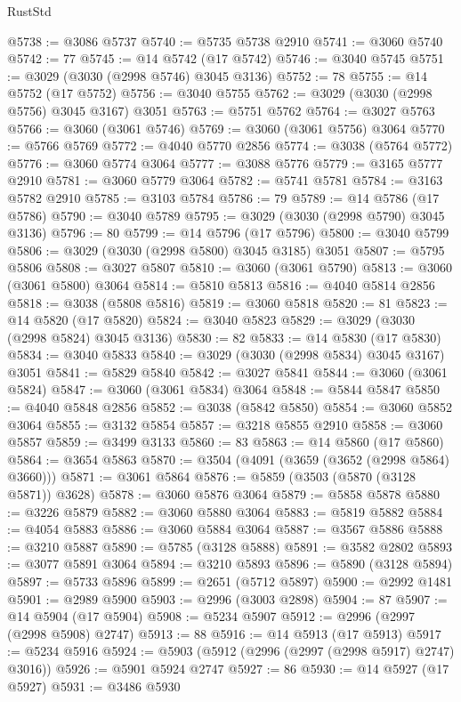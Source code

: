 \begin{lexlean}{RustStd}
\begin{coremodule}
@5738 := @3086 @5737
@5740 := @5735 @5738 @2910
@5741 := @3060 @5740
@5742 := 77
@5745 := @14 @5742 (@17 @5742)
@5746 := @3040 @5745
@5751 := @3029 (@3030 (@2998 @5746) @3045 @3136)
@5752 := 78
@5755 := @14 @5752 (@17 @5752)
@5756 := @3040 @5755
@5762 := @3029 (@3030 (@2998 @5756) @3045 @3167) @3051
@5763 := @5751 @5762
@5764 := @3027 @5763
@5766 := @3060 (@3061 @5746)
@5769 := @3060 (@3061 @5756) @3064
@5770 := @5766 @5769
@5772 := @4040 @5770 @2856
@5774 := @3038 (@5764 @5772)
@5776 := @3060 @5774 @3064
@5777 := @3088 @5776
@5779 := @3165 @5777 @2910
@5781 := @3060 @5779 @3064
@5782 := @5741 @5781
@5784 := @3163 @5782 @2910
@5785 := @3103 @5784
@5786 := 79
@5789 := @14 @5786 (@17 @5786)
@5790 := @3040 @5789
@5795 := @3029 (@3030 (@2998 @5790) @3045 @3136)
@5796 := 80
@5799 := @14 @5796 (@17 @5796)
@5800 := @3040 @5799
@5806 := @3029 (@3030 (@2998 @5800) @3045 @3185) @3051
@5807 := @5795 @5806
@5808 := @3027 @5807
@5810 := @3060 (@3061 @5790)
@5813 := @3060 (@3061 @5800) @3064
@5814 := @5810 @5813
@5816 := @4040 @5814 @2856
@5818 := @3038 (@5808 @5816)
@5819 := @3060 @5818
@5820 := 81
@5823 := @14 @5820 (@17 @5820)
@5824 := @3040 @5823
@5829 := @3029 (@3030 (@2998 @5824) @3045 @3136)
@5830 := 82
@5833 := @14 @5830 (@17 @5830)
@5834 := @3040 @5833
@5840 := @3029 (@3030 (@2998 @5834) @3045 @3167) @3051
@5841 := @5829 @5840
@5842 := @3027 @5841
@5844 := @3060 (@3061 @5824)
@5847 := @3060 (@3061 @5834) @3064
@5848 := @5844 @5847
@5850 := @4040 @5848 @2856
@5852 := @3038 (@5842 @5850)
@5854 := @3060 @5852 @3064
@5855 := @3132 @5854
@5857 := @3218 @5855 @2910
@5858 := @3060 @5857
@5859 := @3499 @3133
@5860 := 83
@5863 := @14 @5860 (@17 @5860)
@5864 := @3654 @5863
@5870 := @3504 (@4091 (@3659 (@3652 (@2998 @5864) @3660)))
@5871 := @3061 @5864
@5876 := @5859 (@3503 (@5870 (@3128 @5871)) @3628)
@5878 := @3060 @5876 @3064
@5879 := @5858 @5878
@5880 := @3226 @5879
@5882 := @3060 @5880 @3064
@5883 := @5819 @5882
@5884 := @4054 @5883
@5886 := @3060 @5884 @3064
@5887 := @3567 @5886
@5888 := @3210 @5887
@5890 := @5785 (@3128 @5888)
@5891 := @3582 @2802
@5893 := @3077 @5891 @3064
@5894 := @3210 @5893
@5896 := @5890 (@3128 @5894)
@5897 := @5733 @5896
@5899 := @2651 (@5712 @5897)
@5900 := @2992 @1481
@5901 := @2989 @5900
@5903 := @2996 (@3003 @2898)
@5904 := 87
@5907 := @14 @5904 (@17 @5904)
@5908 := @5234 @5907
@5912 := @2996 (@2997 (@2998 @5908) @2747)
@5913 := 88
@5916 := @14 @5913 (@17 @5913)
@5917 := @5234 @5916
@5924 := @5903 (@5912 (@2996 (@2997 (@2998 @5917) @2747) @3016))
@5926 := @5901 @5924 @2747
@5927 := 86
@5930 := @14 @5927 (@17 @5927)
@5931 := @3486 @5930

\end{coremodule}
\end{lexlean}
